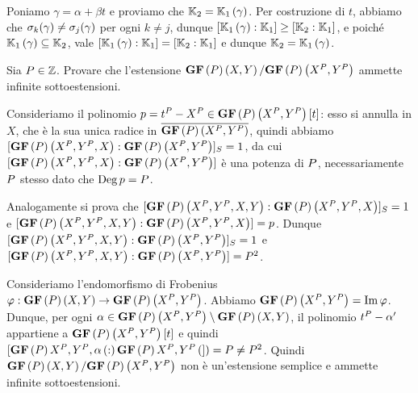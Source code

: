 \par Poniamo $\gamma = \alpha + \beta t$ e proviamo che $\mathbb{K}_2 = \mathbb{K}_1 \left ( \gamma \right )$. Per costruzione di $t$, abbiamo che $\sigma_k(\gamma) \neq \sigma_j(\gamma)$ per ogni $k \neq j$, dunque $[\mathbb{K}_1 \left ( \gamma \right ):\mathbb{K}_1] \geq [\mathbb{K}_2:\mathbb{K}_1]$, e poich\'e $\mathbb{K}_1 \left ( \gamma \right ) \subseteq \mathbb{K}_2$, vale $[\mathbb{K}_1 \left ( \gamma \right ):\mathbb{K}_1] = [\mathbb{K}_2:\mathbb{K}_1]$ e dunque $\mathbb{K}_2 = \mathbb{K}_1 \left ( \gamma \right )$. \EndProof
\begin{Exercice}
	Sia $P \in \mathbb{Z}$. Provare che l'estensione $\textbf{GF} \left ( P \right ) \left ( X,Y \right )/\textbf{GF} \left ( P \right ) \left ( X^P,Y^P \right )$ ammette infinite sottoestensioni.
\end{Exercice}
\Solution Consideriamo il polinomio $p = t^P - X^P \in \textbf{GF} \left ( P \right ) \left ( X^P,Y^P \right ) \left [ t \right ]$: esso si annulla in $X$, che \`e la sua unica radice in $\overline{\textbf{GF} \left ( P \right ) \left ( X^P,Y^P \right )}$, quindi abbiamo $[\textbf{GF} \left ( P \right ) \left ( X^P,Y^P,X \right ):\textbf{GF} \left ( P \right ) \left ( X^P,Y^P \right )]_S = 1$, da cui $[\textbf{GF} \left ( P \right ) \left ( X^P,Y^P,X \right ):\textbf{GF} \left ( P \right ) \left ( X^P,Y^P \right )]$ \`e una potenza di $P$, necessariamente $P$ stesso dato che $\operatorname{Deg} p = P$.
\par Analogamente si prova che $[\textbf{GF} \left ( P \right ) \left ( X^P,Y^P,X,Y \right ):\textbf{GF} \left ( P \right ) \left ( X^P,Y^P,X \right )]_S = 1$ e $[\textbf{GF} \left ( P \right ) \left ( X^P,Y^P,X,Y \right ):\textbf{GF} \left ( P \right ) \left ( X^P,Y^P,X \right )] = p$. Dunque $[\textbf{GF} \left ( P \right ) \left ( X^P,Y^P,X,Y \right ):\textbf{GF} \left ( P \right ) \left ( X^P,Y^P \right )]_S = 1$ e $[\textbf{GF} \left ( P \right ) \left ( X^P,Y^P,X,Y \right ):\textbf{GF} \left ( P \right ) \left ( X^P,Y^P \right )] = P^2$.
\par Consideriamo l'endomorfismo di Frobenius $\varphi: \textbf{GF} \left ( P \right ) \left ( X,Y \right ) \rightarrow \textbf{GF} \left ( P \right ) \left ( X^P,Y^P \right )$. Abbiamo $\textbf{GF} \left ( P \right ) \left ( X^P,Y^P \right ) = \operatorname{Im}{\varphi}$. Dunque, per ogni $\alpha \in \textbf{GF} \left ( P \right ) \left ( X^P,Y^P \right ) \setminus \textbf{GF} \left ( P \right ) \left ( X,Y \right )$, il polinomio $t^P - \alpha^\prime$ appartiene a $\textbf{GF} \left ( P \right ) \left ( X^P,Y^P \right ) \left [ t \right ]$ e quindi $[\textbf{GF} \left ( P \right ){X^P,Y^P, \alpha} \left ( : \right )\textbf{GF} \left ( P \right ){X^P,Y^P} \left ( ] \right ) = P \neq P^2$. Quindi $\textbf{GF} \left ( P \right ) \left ( X,Y \right )/\textbf{GF} \left ( P \right ) \left ( X^P,Y^P \right )$ non \`e un'estensione semplice e ammette infinite sottoestensioni. \EndProof
